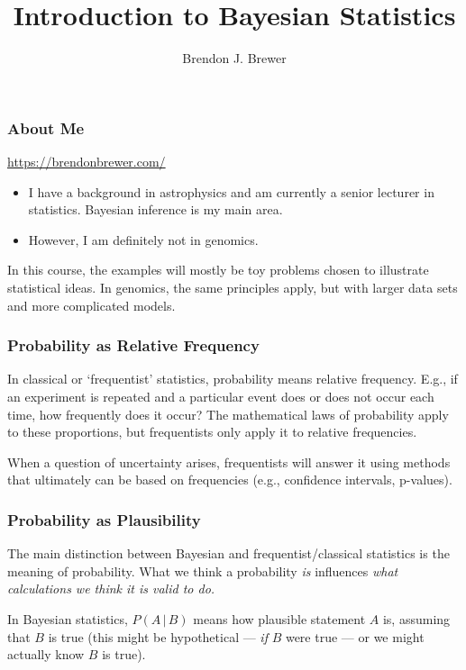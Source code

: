 \documentclass{beamer}
\author{Brendon J. Brewer}
\title{Introduction to Bayesian Statistics}
\institute{Summer Institute in Statistical Genomics \\
The University of Auckland, November 2026}
\date{}
\newcommand{\given}{\,|\,}
\begin{document}
\frame{\titlepage}

\begin{frame}
\frametitle{About Me}

\url{https://brendonbrewer.com/}
\pause

\begin{itemize}
\item I have a background in astrophysics and am currently a senior lecturer
in statistics. Bayesian inference is my main area. \pause
\item However, I am definitely not in genomics.
\end{itemize}


\end{frame}


\begin{frame}
In this course, the examples will mostly be toy problems chosen to illustrate statistical ideas. In genomics, the same principles apply, but with larger data sets and more complicated models.
\end{frame}




\begin{frame}
\frametitle{Probability as Relative Frequency}
In classical or `frequentist' statistics, probability means
relative frequency. E.g., if an experiment is repeated
and a particular event does or does not occur each time, how
frequently does it occur?
The mathematical laws of probability apply to these
proportions, but frequentists only apply it to relative
frequencies.\pause

When a question of uncertainty arises, frequentists will answer
it using methods that ultimately can be based on frequencies
(e.g., confidence intervals, p-values).

\end{frame}



\begin{frame}
\frametitle{Probability as Plausibility}
The main distinction between Bayesian and frequentist/classical statistics
is the meaning of probability. What we think a probability {\em is}
influences {\em what calculations we think it is valid to do.}\\[0.5em]\pause

In Bayesian statistics, $P(A \given B)$ means how plausible statement $A$ is,
assuming that $B$ is true (this might be hypothetical --- {\em if} $B$
were true --- or we might actually know $B$ is true).

\end{frame}
\end{document}
